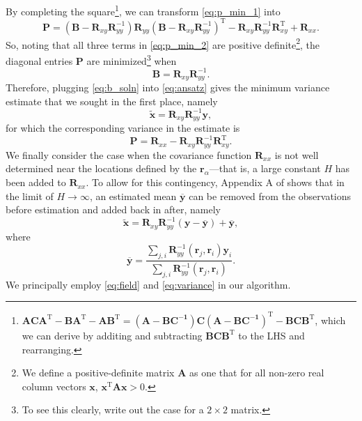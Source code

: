 \documentclass[12pt]{article}
\begin{document}
By completing the square\footnote{$\bm{ACA}^{\textrm{T}} - \bm{BA}^{\textrm{T}} - \bm{AB}^{\textrm{T}} = \left(\bm{A - \bm{BC}^{-1}}\right)\bm{C}\left(\bm{A - \bm{BC}^{-1}}\right)^{\textrm{T}} - \bm{BCB}^{\textrm{T}}$, which we can derive by additing and subtracting $\bm{BCB}^{\textrm{T}}$ to the LHS and rearranging.}, we can transform \eqref{eq:p_min_1} into
\begin{equation}
	\bm{P} = \left(\bm{B} - \bm{R}_{xy}\bm{R}_{yy}^{-1}\right)\bm{R}_{yy}\left(\bm{B} - \bm{R}_{xy}\bm{R}_{yy}^{-1}\right)^{\textrm{T}} - \bm{R}_{xy}\bm{R}_{yy}^{-1}\bm{R}_{xy}^{\textrm{T}} + \bm{R}_{xx}.
	\label{eq:p_min_2}
\end{equation}
So, noting that all three terms in \eqref{eq:p_min_2} are positive definite\footnote{We define a positive-definite matrix $\bm{A}$ as one that for all non-zero real column vectors $\bm{x}$, $\bm{x}^{\textrm{T}}\bm{Ax} > 0$.}, the diagonal entries $\bm{P}$ are minimized\footnote{To see this clearly, write out the case for a $2 \times 2$ matrix.} when 
\begin{equation}
	\bm{B} = \bm{R}_{xy}\bm{R}_{yy}^{-1}.
	\label{eq:b_soln}
\end{equation}
Therefore, plugging \eqref{eq:b_soln} into \eqref{eq:ansatz} gives the minimum variance estimate that we sought in the first place, namely
\begin{equation}
	\bm{\tilde{x}} = \bm{R}_{xy}\bm{R}_{yy}^{-1}\bm{y},
\end{equation}
for which the corresponding variance in the estimate is
\begin{equation}
	\bm{P} = \bm{R}_{xx} - \bm{R}_{xy}\bm{R}_{yy}^{-1}\bm{R}_{xy}^{\textrm{T}}.
	\label{eq:variance}
\end{equation}
We finally consider the case when the covariance function $\bm{R}_{xx}$ is not well determined near the locations defined by the $\bm{r}_{\alpha}$---that is, a large constant $H$ has been added to $\bm{R}_{xx}$.
To allow for this contingency, Appendix A of \cite{bretherton1976} shows that in the limit of $H \to \infty$, an estimated mean $\bm{\overline{y}}$ can be removed from the observations before estimation and added back in after, namely
\begin{equation}
	\bm{\tilde{x}} = \bm{R}_{xy}\bm{R}_{yy}^{-1}\left(\bm{y} - \bm{\overline{y}}\right) + \bm{\overline{y}},
\end{equation}
where
\begin{equation}
	\bm{\overline{y}} = \frac{\sum_{j,i} \bm{R}_{yy}^{-1}\left(\bm{r}_j, \bm{r}_i\right)\bm{y}_i}{\sum_{j,i} \bm{R}_{yy}^{-1}\left(\bm{r}_j, \bm{r}_i\right)}.
	\label{eq:field}
\end{equation}
We principally employ \eqref{eq:field} and \eqref{eq:variance} in our algorithm.
\end{document}
